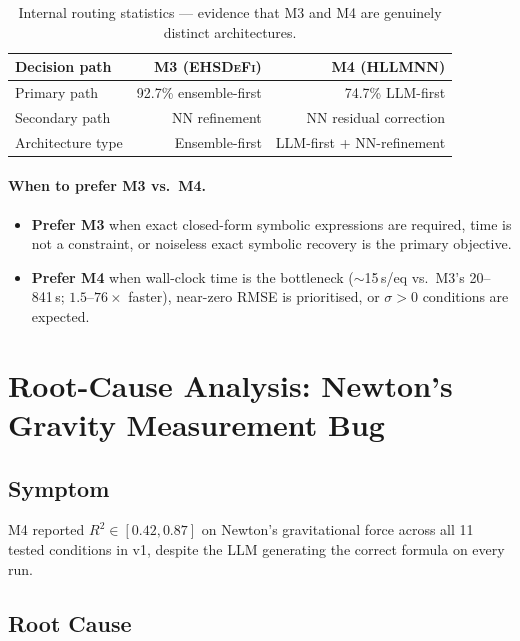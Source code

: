 \documentclass[twoside,11pt]{article}
\newcommand{\EHD}{\textsc{EHSDeFi}}
\newcommand{\HSL}{\textsc{HLLMNN}}
\newcommand{\Rsq}{R^{2}}
\begin{document}
\begin{table}[H]
\centering
\caption{Internal routing statistics — evidence that M3 and M4 are genuinely
         distinct architectures.}
\label{tab:arch}
\small
\begin{tabular}{L{3.5cm} r r}
\toprule
\textbf{Decision path} & \textbf{M3 (\EHD)} & \textbf{M4 (\HSL)}\\
\midrule
Primary path    & 92.7\% ensemble-first  & 74.7\% LLM-first\\
Secondary path  & NN refinement          & NN residual correction\\
Architecture type & Ensemble-first       & LLM-first + NN-refinement\\
\bottomrule
\end{tabular}
\end{table}

\paragraph{When to prefer M3 vs.\ M4.}
\begin{itemize}
\item \textbf{Prefer M3} when exact closed-form symbolic expressions are
  required, time is not a constraint, or noiseless exact symbolic recovery
  is the primary objective.
\item \textbf{Prefer M4} when wall-clock time is the bottleneck
  ($\sim$15\,s/eq vs.\ M3's 20--841\,s; $1.5$--$76\times$ faster),
  near-zero RMSE is prioritised, or $\sigma>0$ conditions are expected.
\end{itemize}

\section{Root-Cause Analysis: Newton's Gravity Measurement Bug}
\label{sec:bugfix}

\subsection{Symptom}

M4 reported $\Rsq \in [0.42, 0.87]$ on Newton's gravitational force across
all 11 tested conditions in v1, despite the LLM generating the correct formula
on every run.

\subsection{Root Cause}
\end{document}
